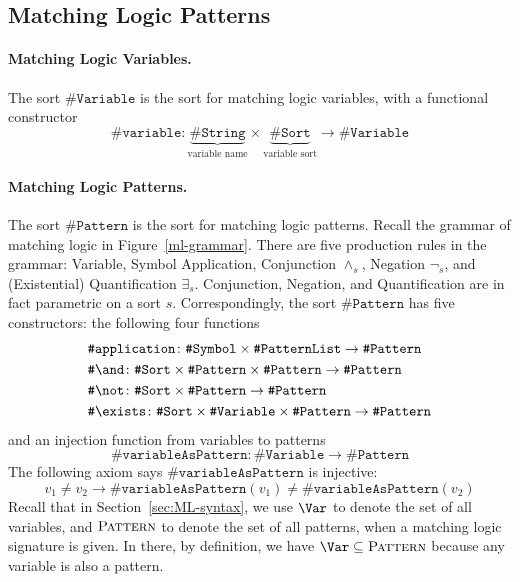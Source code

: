 \documentclass[UTF8,11pt]{article}
\theoremstyle{plain}
\theoremstyle{definition}
\theoremstyle{remark}
\newcommand{\sharpsymbol}{\#}
\newcommand{\KString}{\texttt{\sharpsymbol String}}
\newcommand{\KSort}{\texttt{\sharpsymbol Sort}}
\newcommand{\KSymbol}{\texttt{\sharpsymbol Symbol}}
\newcommand{\KPatternList}{\texttt{\sharpsymbol PatternList}}
\newcommand{\KVariable}{\texttt{\sharpsymbol Variable}}
\newcommand{\KVariableAsKPattern}{\texttt{\sharpsymbol variableAsPattern}}
\newcommand{\KPattern}{\texttt{\sharpsymbol Pattern}}
\newcommand{\Kvariable}{\texttt{\sharpsymbol variable}}
\newcommand{\Kand}{\texttt{\sharpsymbol  \slashsymbol and}}
\newcommand{\Knot}{\texttt{\sharpsymbol  \slashsymbol not}}
\newcommand{\Kapplication}{\texttt{\sharpsymbol application}}
\newcommand{\Kexists}{\texttt{\sharpsymbol \slashsymbol  exists}}
\newcommand{\Pattern}{\textsc{Pattern}\xspace}
\newcommand{\slashsymbol}{\symbol{92}}
\begin{document}
\subsection{Matching Logic Patterns}
\label{sec:ML-patterns}

\paragraph{Matching Logic Variables.}
The sort $\KVariable$ is the sort for 
matching logic variables, with a functional constructor
\begin{equation*}
  \Kvariable \colon \underbrace{\KString}_\text{variable name} \times 
  \underbrace{\KSort}_\text{variable sort} \to \KVariable
\end{equation*}

\paragraph{Matching Logic Patterns.}
The sort $\KPattern$ is the sort for matching logic patterns.
Recall the grammar of matching logic in Figure~\ref{ml-grammar}.
There are five production rules in the grammar: Variable, Symbol Application, 
Conjunction $\wedge_s$, Negation $\neg_s$, and (Existential) Quantification 
$\exists_s$.
Conjunction, Negation, and Quantification are in fact 
parametric on a sort $s$.
Correspondingly, the sort $\KPattern$ has five constructors:
the following four functions
\begin{align*}
  & \Kapplication \colon \KSymbol \times \KPatternList \to \KPattern
  \\
  & \Kand \colon \KSort \times \KPattern \times \KPattern \to \KPattern
  \\
  & \Knot \colon \KSort \times \KPattern \to \KPattern
  \\
  & \Kexists \colon \KSort \times \KVariable \times \KPattern \to \KPattern
\end{align*}
and an injection function from variables to patterns
\begin{equation*}
  \KVariableAsKPattern \colon \KVariable \to \KPattern
\end{equation*}
The following axiom says $\KVariableAsKPattern$ is injective:
$$
v_1 \neq v_2 \to \KVariableAsKPattern(v_1) \neq \KVariableAsKPattern(v_2)
$$
Recall that in Section~\ref{sec:ML-syntax}, we use $\Var$ to denote the set of all variables, and $\Pattern$ to denote the set of all patterns, when a matching logic signature is given.
In there, by definition, we have $\Var \subseteq \Pattern$ because any variable is also a pattern.
\end{document}
